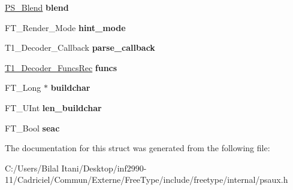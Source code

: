 \begin{DoxyCompactItemize}
\item 
\hyperlink{struct_p_s___blend_rec__}{P\+S\+\_\+\+Blend} {\bfseries blend}\hypertarget{struct_t1___decoder_rec___a0cd698c7041cb4f319949b62f215f7c7}{}\label{struct_t1___decoder_rec___a0cd698c7041cb4f319949b62f215f7c7}

\item 
F\+T\+\_\+\+Render\+\_\+\+Mode {\bfseries hint\+\_\+mode}\hypertarget{struct_t1___decoder_rec___a364b15149edb573dcc79be015eba61b4}{}\label{struct_t1___decoder_rec___a364b15149edb573dcc79be015eba61b4}

\item 
T1\+\_\+\+Decoder\+\_\+\+Callback {\bfseries parse\+\_\+callback}\hypertarget{struct_t1___decoder_rec___a840af0b01e7adb1e3aa521a936196b62}{}\label{struct_t1___decoder_rec___a840af0b01e7adb1e3aa521a936196b62}

\item 
\hyperlink{struct_t1___decoder___funcs_rec__}{T1\+\_\+\+Decoder\+\_\+\+Funcs\+Rec} {\bfseries funcs}\hypertarget{struct_t1___decoder_rec___a6b0f5f7cb3f44e88880aa9c927d79775}{}\label{struct_t1___decoder_rec___a6b0f5f7cb3f44e88880aa9c927d79775}

\item 
F\+T\+\_\+\+Long $\ast$ {\bfseries buildchar}\hypertarget{struct_t1___decoder_rec___a967ee06cbbdc8823be8f95df5db625b9}{}\label{struct_t1___decoder_rec___a967ee06cbbdc8823be8f95df5db625b9}

\item 
F\+T\+\_\+\+U\+Int {\bfseries len\+\_\+buildchar}\hypertarget{struct_t1___decoder_rec___a55fd1c88d6f7badaec2aa13db17c816f}{}\label{struct_t1___decoder_rec___a55fd1c88d6f7badaec2aa13db17c816f}

\item 
F\+T\+\_\+\+Bool {\bfseries seac}\hypertarget{struct_t1___decoder_rec___a45bf18b54ff973177ea3061ef0b705c6}{}\label{struct_t1___decoder_rec___a45bf18b54ff973177ea3061ef0b705c6}

\end{DoxyCompactItemize}


The documentation for this struct was generated from the following file\+:\begin{DoxyCompactItemize}
\item 
C\+:/\+Users/\+Bilal Itani/\+Desktop/inf2990-\/11/\+Cadriciel/\+Commun/\+Externe/\+Free\+Type/include/freetype/internal/psaux.\+h\end{DoxyCompactItemize}
